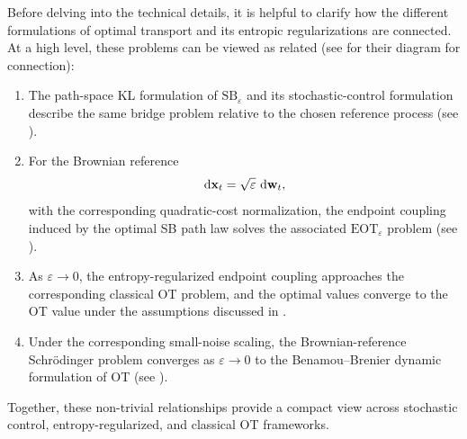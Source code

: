 Before delving into the technical details, it is helpful to clarify how the different formulations of optimal transport and its entropic regularizations are connected. At a high level, these problems can be viewed as related (see  for their diagram for connection):
\begin{enumerate}
    \item[(i)] 
    The path-space KL formulation of $\mathrm{SB}_\varepsilon$ and its
    stochastic-control formulation describe the same bridge problem relative
    to the chosen reference process (see ).

    \item[(ii)] 
    For the Brownian reference
    \[
    \mathop{}\!\mathrm{d} {\mathbf{x}}_t=\sqrt{\varepsilon}\,\mathop{}\!\mathrm{d}{\mathbf{w}}_t,
    \]
    with the corresponding quadratic-cost normalization, the endpoint coupling
    induced by the optimal SB path law solves the associated
    $\mathrm{EOT}_\varepsilon$ problem (see ).

    \item[(iii)] 
    As $\varepsilon\to0$, the entropy-regularized endpoint coupling approaches
    the corresponding classical OT problem, and the optimal values converge to
    the OT value under the assumptions discussed in
    .

    \item[(iv)] 
    Under the corresponding small-noise scaling, the Brownian-reference
    Schr\"odinger problem converges as $\varepsilon\to0$ to the
    Benamou--Brenier dynamic formulation of OT
    (see ).
\end{enumerate}


Together, these non-trivial relationships provide a compact view across stochastic control, entropy-regularized, and classical OT frameworks.


                             

